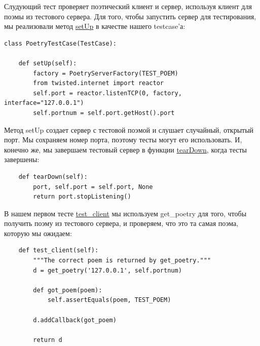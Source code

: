 Слудующий тест проверяет поэтический клиент и сервер, используя клиент 
для поэмы из тестового сервера. Для того, чтобы запустить 
сервер для тестирования, мы реализовали метод 
\href{http://github.com/jdavisp3/twisted-intro/blob/master/tests/test\_poetry.py#L70}{setUp} 
в качестве нашего testcase'а:

\begin{scriptsize}\begin{verbatim}
class PoetryTestCase(TestCase):

    def setUp(self):
        factory = PoetryServerFactory(TEST_POEM)
        from twisted.internet import reactor
        self.port = reactor.listenTCP(0, factory, interface="127.0.0.1")
        self.portnum = self.port.getHost().port
\end{verbatim}\end{scriptsize}



Метод setUp создает сервер с тестовой поэмой и слушает случайный, 
открытый порт. Мы сохраняем номер порта, поэтому тесты могут его 
использовать. И, конечно же, мы завершаем тестовый сервер в 
функции 
\href{http://github.com/jdavisp3/twisted-intro/blob/master/tests/test\_poetry.py#L76}{tearDown}, 
когда тесты завершены:

\begin{scriptsize}\begin{verbatim}
    def tearDown(self):
        port, self.port = self.port, None
        return port.stopListening()
\end{verbatim}\end{scriptsize}

В нашем первом тесте 
\href{http://github.com/jdavisp3/twisted-intro/blob/master/tests/test\_poetry.py#L80}{test\_client} 
мы используем get\_poetry для того, чтобы получить поэму 
из тестового сервера, и проверяем, что это та самая поэма, которую мы ожидаем:

\begin{scriptsize}\begin{verbatim}
    def test_client(self):
        """The correct poem is returned by get_poetry."""
        d = get_poetry('127.0.0.1', self.portnum)

        def got_poem(poem):
            self.assertEquals(poem, TEST_POEM)

        d.addCallback(got_poem)

        return d

\end{verbatim}\end{scriptsize}


